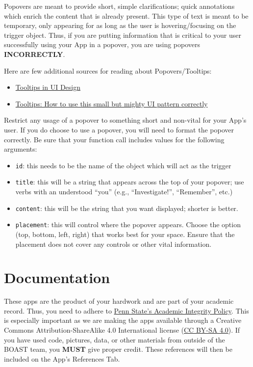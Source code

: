 \documentclass[]{book}
\providecommand{\tightlist}{%
  \setlength{\itemsep}{0pt}\setlength{\parskip}{0pt}}
\begin{document}
Popovers are meant to provide short, simple clarifications; quick annotations which enrich the content that is already present. This type of text is meant to be temporary, only appearing for as long as the user is hovering/focusing on the trigger object. Thus, if you are putting information that is critical to your user successfully using your App in a popover, you are using popovers \textbf{INCORRECTLY}.

Here are few additional sources for reading about Popovers/Tooltips:

\begin{itemize}
\tightlist
\item
  \href{https://uxplanet.org/tooltips-in-ui-design-f63e117aa3d1}{Tooltips in UI Design}
\item
  \href{https://www.appcues.com/blog/tooltips}{Tooltips: How to use this small but mighty UI pattern correctly}
\end{itemize}

Restrict any usage of a popover to something short and non-vital for your App's user. If you do choose to use a popover, you will need to format the popover correctly. Be sure that your function call includes values for the following arguments:

\begin{itemize}
\tightlist
\item
  \texttt{id}: this needs to be the name of the object which will act as the trigger
\item
  \texttt{title}: this will be a string that appears across the top of your popover; use verbs with an understood ``you'' (e.g., ``Investigate!'', ``Remember'', etc.)
\item
  \texttt{content}: this will be the string that you want displayed; shorter is better.
\item
  \texttt{placement}: this will control where the popover appears. Choose the option (top, bottom, left, right) that works best for your space. Ensure that the placement does not cover any controls or other vital information.
\end{itemize}

\hypertarget{documentation}{%
\chapter{Documentation}\label{documentation}}

These apps are the product of your hardwork and are part of your academic record. Thus, you need to adhere to \href{https://undergrad.psu.edu/aappm/G-9-academic-integrity.html}{Penn State's Academic Integrity Policy}. This is especially important as we are making the apps available through a Creative Commons Attribution-ShareAlike 4.0 International license (\href{https://creativecommons.org/licenses/by-sa/4.0/}{CC BY-SA 4.0}). If you have used code, pictures, data, or other materials from outside of the BOAST team, you \textbf{MUST} give proper credit. These references will then be included on the App's References Tab.
\end{document}
